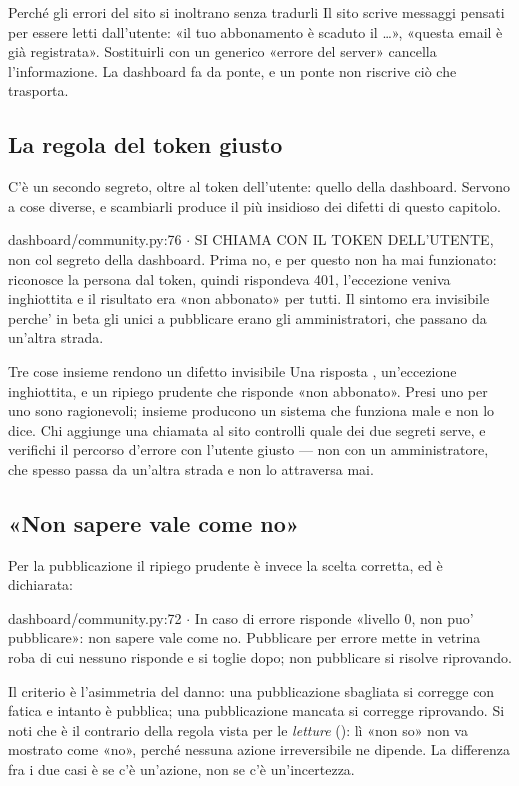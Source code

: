\begin{perche}{Perché gli errori del sito si inoltrano senza tradurli}
Il sito scrive messaggi pensati per essere letti dall'utente: «il tuo
abbonamento è scaduto il \ldots», «questa email è già registrata». Sostituirli
con un generico «errore del server» cancella l'informazione. La dashboard fa
da ponte, e un ponte non riscrive ciò che trasporta.
\end{perche}

\subsection{La regola del token giusto}

C'è un secondo segreto, oltre al token dell'utente: quello della dashboard.
Servono a cose diverse, e scambiarli produce il più insidioso dei difetti
di questo capitolo.

\begin{commento}{dashboard/community.py:76 $\cdot$ }
SI CHIAMA CON IL TOKEN DELL'UTENTE, non col segreto della dashboard.
Prima no, e per questo non ha mai funzionato: 
riconosce la persona dal token, quindi rispondeva 401, l'eccezione veniva
inghiottita e il risultato era «non abbonato» per tutti. Il sintomo era
invisibile perche' in beta gli unici a pubblicare erano gli
amministratori, che passano da un'altra strada.
\end{commento}

\begin{attenzione}{Tre cose insieme rendono un difetto invisibile}
Una risposta , un'eccezione inghiottita, e un ripiego prudente che
risponde «non abbonato». Presi uno per uno sono ragionevoli; insieme
producono un sistema che funziona male e non lo dice. Chi aggiunge una
chiamata al sito controlli quale dei due segreti serve, e verifichi il
percorso d'errore con l'utente giusto --- non con un amministratore, che
spesso passa da un'altra strada e non lo attraversa mai.
\end{attenzione}

\subsection{«Non sapere vale come no»}

Per la pubblicazione il ripiego prudente è invece la scelta corretta, ed è
dichiarata:

\begin{commento}{dashboard/community.py:72 $\cdot$ }
In caso di errore risponde «livello 0, non puo' pubblicare»: non sapere
vale come no. Pubblicare per errore mette in vetrina roba di cui nessuno
risponde e si toglie dopo; non pubblicare si risolve riprovando.
\end{commento}

\noindent
Il criterio è l'asimmetria del danno: una pubblicazione sbagliata si corregge
con fatica e intanto è pubblica; una pubblicazione mancata si corregge
riprovando. Si noti che è il contrario della regola vista per le \emph{letture}
(): lì «non so» non va mostrato come «no», perché
nessuna azione irreversibile ne dipende. La differenza fra i due casi è se
c'è un'azione, non se c'è un'incertezza.
